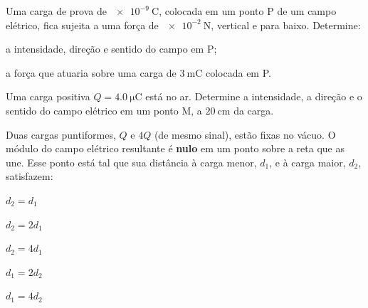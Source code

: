 \blocoaplicacao
\begin{questao}[2]{}

Uma carga de prova de $\SI{e-9}{\coulomb}$, colocada em um ponto P de um campo
elétrico, fica sujeita a uma força de $\SI{e-2}{\newton}$, vertical e para baixo.
Determine:
\begin{itensq}
\item a intensidade, direção e sentido do campo em P;
\item a força que atuaria sobre uma carga de $\SI{3}{\milli\coulomb}$ colocada em P.
\end{itensq}


\end{questao}
\begin{questao}[2]{}

Uma carga positiva $Q = \SI{4.0}{\micro\coulomb}$ está no ar. Determine a
intensidade, a direção e o sentido do campo elétrico em um ponto M, a
$\SI{20}{\centi\meter}$ da carga.


\end{questao}
\begin{questao}[2]{}

Duas cargas puntiformes, $Q$ e $4Q$ (de mesmo sinal), estão fixas no vácuo. O
módulo do campo elétrico resultante é \textbf{nulo} em um ponto sobre a reta que
as une. Esse ponto está tal que sua distância à carga menor, $d_1$, e à carga
maior, $d_2$, satisfazem:
\begin{alternativas}[2]
\item $d_2 = d_1$
\item $d_2 = 2d_1$
\item $d_2 = 4d_1$
\item $d_1 = 2d_2$
\item $d_1 = 4d_2$
\end{alternativas}


\end{questao}
